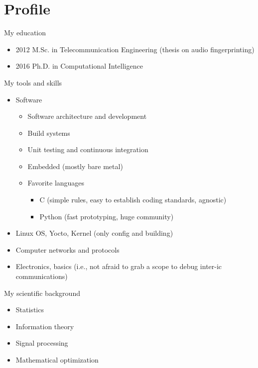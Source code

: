 \documentclass{if-beamer}
\title[]{}
\author{Giulio Luzzati}
\date{}
\begin{document}






\section{Profile}

\begin{frame}
\small
My education


\begin{itemize}
\item 2012 M.Sc. in Telecommunication Engineering (thesis on audio fingerprinting)
\item 2016 Ph.D. in Computational Intelligence
\end{itemize}

My tools and skills


\begin{itemize}
\item Software
\begin{itemize}
\item Software architecture and development
\item Build systems
\item Unit testing and continuous integration
\item Embedded (mostly bare metal)
\item Favorite languages
\begin{itemize}
\item C (simple rules, easy to establish coding standards, agnostic)
\item Python (fast prototyping, huge community)
\end{itemize}
\end{itemize}
\item Linux OS, Yocto, Kernel (only config and building)
\item Computer networks and protocols
\item Electronics, basics (i.e., not afraid to grab a scope to debug inter-ic communications)
\end{itemize}
My scientific background
\begin{itemize}
\item Statistics
\item Information theory
\item Signal processing
\item Mathematical optimization
\end{itemize}
\end{frame}
\end{document}
